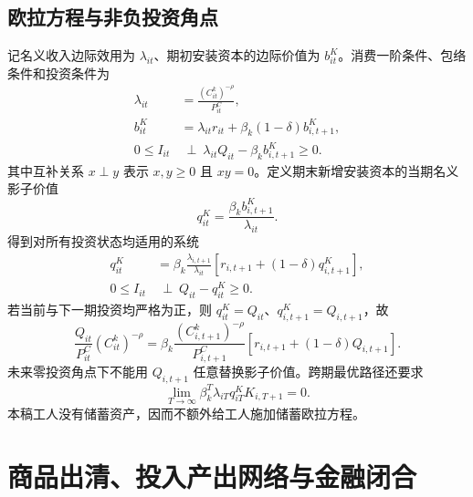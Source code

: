 \documentclass[UTF8,a4paper,zihao=-4,fontset=windows]{ctexart}
\numberwithin{equation}{section}
\newcommand{\pc}{P^{C}}
\newcommand{\invp}{Q}
\begin{document}
\subsection{欧拉方程与非负投资角点}
记名义收入边际效用为 $\lambda_{it}$、期初安装资本的边际价值为 $b^K_{it}$。消费一阶条件、包络条件和投资条件为
\begin{align}
 \lambda_{it}&=\frac{(C^k_{it})^{-\rho}}{\pc_{it}},
 \label{eq:lg-lambda}\\
 b^K_{it}&=\lambda_{it}r_{it}+\beta_k(1-\delta)b^K_{i,t+1},
 \label{eq:lg-capital-envelope}\\
 0\leq I_{it}&\ \perp\ \lambda_{it}\invp_{it}-\beta_kb^K_{i,t+1}\geq0.
\end{align}
其中互补关系 $x\perp y$ 表示 $x,y\geq0$ 且 $xy=0$。定义期末新增安装资本的当期名义影子价值
\begin{equation}
 q^K_{it}=\frac{\beta_kb^K_{i,t+1}}{\lambda_{it}}.
\end{equation}
得到对所有投资状态均适用的系统
\begin{align}
 q^K_{it}&=\beta_k\frac{\lambda_{i,t+1}}{\lambda_{it}}
 \left[r_{i,t+1}+(1-\delta)q^K_{i,t+1}\right],
 \label{eq:lg-q-euler}\\
 0\leq I_{it}&\ \perp\ \invp_{it}-q^K_{it}\geq0.
 \label{eq:lg-investment-complementarity}
\end{align}
若当前与下一期投资均严格为正，则 $q^K_{it}=\invp_{it}$、$q^K_{i,t+1}=\invp_{i,t+1}$，故
\begin{equation}
 \frac{\invp_{it}}{\pc_{it}}(C^k_{it})^{-\rho}
 =\beta_k\frac{(C^k_{i,t+1})^{-\rho}}{\pc_{i,t+1}}
 \left[r_{i,t+1}+(1-\delta)\invp_{i,t+1}\right].
 \label{eq:lg-capital-euler-interior}
\end{equation}
未来零投资角点下不能用 $\invp_{i,t+1}$ 任意替换影子价值。跨期最优路径还要求
\begin{equation}
 \lim_{T\to\infty}\beta_k^T\lambda_{iT}q^K_{iT}K_{i,T+1}=0.
 \label{eq:lg-tvc}
\end{equation}
本稿工人没有储蓄资产，因而不额外给工人施加储蓄欧拉方程。

\section{商品出清、投入产出网络与金融闭合}
\label{sec:lg-market}
\end{document}
